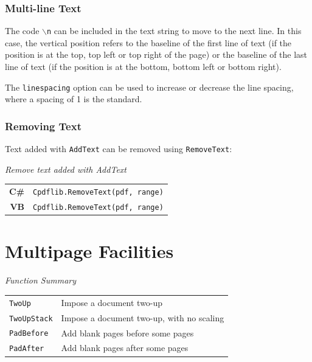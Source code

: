 \documentclass[a4paper]{memoir}
\begin{document}
\subsection{Multi-line Text}
The code \texttt{$\backslash$n} can be included in the text string to move to
the next line. In this case, the vertical position refers to the baseline of
the first line of text (if the position is at the top, top left or top right of
the page) or the baseline of the last line of text (if the position is at the
bottom, bottom left or bottom right).

The \texttt{linespacing} option can be used to increase or decrease the line
spacing, where a spacing of 1 is the standard.

\subsection{Removing Text}
Text added with \texttt{AddText} can be removed using \texttt{RemoveText}:

\begin{framed}
\noindent\textit{Remove text added with AddText}

\vspace{2mm}
\noindent\begin{tabular}{rl}
\small\sffamily\textbf{C\#} &
\begin{minipage}{4in}
\small\verb!Cpdflib.RemoveText(pdf, range)!
\end{minipage}\\[5mm]
\small\sffamily\textbf{VB} &
\begin{minipage}{4in}
\small\verb!Cpdflib.RemoveText(pdf, range)!
\end{minipage}\\[5mm]
\end{tabular}
\end{framed}

\chapter{Multipage Facilities}
\begin{framed}
\noindent\textit{Function Summary}\\[2mm]
\noindent\begin{tabular}{ll}
\verb!TwoUp! & Impose a document two-up\\
\verb!TwoUpStack! & Impose a document two-up, with no scaling\\
\verb!PadBefore! & Add blank pages before some pages\\
\verb!PadAfter! & Add blank pages after some pages
\end{tabular}
\end{framed}
\end{document}
